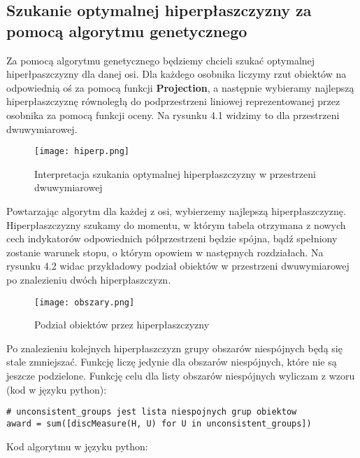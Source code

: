 \documentclass[magisterska]{pracamgr}
\theoremstyle{plain}
\theoremstyle{definition}
\theoremstyle{remark}
\begin{document}
\subsection{Szukanie optymalnej hiperpłaszczyzny za pomocą algorytmu genetycznego}
Za pomocą algorytmu genetycznego będziemy chcieli szukać optymalnej hiperłpaszczyzny dla danej osi. Dla każdego osobnika liczymy rzut obiektów na 
odpowiednią oś za pomocą funkcji \textbf{Projection}, a następnie wybieramy najlepszą hiperpłaszczyznę równoległą do podprzestrzeni liniowej 
reprezentowanej przez osobnika za pomocą funkcji oceny. Na rysunku 4.1 widzimy to dla przestrzeni dwuwymiarowej.
\begin{figure}
 \caption{Interpretacja szukania optymalnej hiperpłaszczyzny w przestrzeni dwuwymiarowej}
 \texttt{[image: hiperp.png]}
\end{figure}
Powtarzając algorytm dla każdej z osi,
wybierzemy najlepszą hiperpłaszczyznę. Hiperpłaszczyzny szukamy do momentu, w którym tabela otrzymana z nowych cech indykatorów odpowiednich 
półprzestrzeni będzie spójna, bądź spełniony zostanie warunek stopu, o którym opowiem w następnych rozdziałach. Na rysunku 4.2 widac 
przykładowy podział obiektów
w przestrzeni dwuwymiarowej po znalezieniu dwóch hiperpłaszczyzn.
\begin{figure}
 \caption{Podział obiektów przez hiperpłaszczyzny}
 \texttt{[image: obszary.png]}
\end{figure}
Po znalezieniu kolejnych hiperpłaszczyzn grupy obszarów niespójnych będą się stale zmniejszać. Funkcję liczę jedynie dla obszarów
niespójnych, które nie są jeszcze podzielone. Funkcję celu dla listy obszarów niespójnych wyliczam z wzoru (kod w języku python):
\begin{lstlisting}
# unconsistent_groups jest lista niespojnych grup obiektow
award = sum([discMeasure(H, U) for U in unconsistent_groups])
\end{lstlisting}
Kod algorytmu w języku python:
\end{document}
